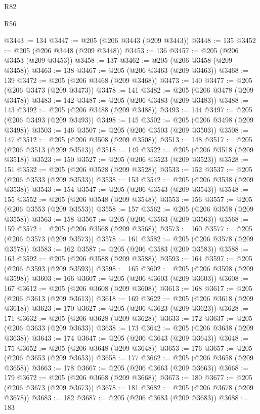 \begin{lexlean}{R82}
\begin{lexlean}{R56}
\begin{coremodule}
{{{{{{{{{{{{{{{{{{{{{{{{{{{{{{{{{{{{{{{{{{{{{{{{{{{{{{{{{{{{{{{{{{{{{{{{{{{{{{{{{{{{{{{{{{{{{{{{{{{{{{{{{{{{{{{{{{{{{{{{{{{{{{{{{{{{{{{{{{{{{{{{{{{{{{{{{{{{{{{{{{{{{{{{{{{{{{{{{{{{{{{{{{{{{{{{{{{{{{{{{{{{{{{{{{{@3443 := 134
@3447 := @205 (@206 @3443 (@209 @3443))
@3448 := 135
@3452 := @205 (@206 @3448 (@209 @3448))
@3453 := 136
@3457 := @205 (@206 @3453 (@209 @3453))
@3458 := 137
@3462 := @205 (@206 @3458 (@209 @3458))
@3463 := 138
@3467 := @205 (@206 @3463 (@209 @3463))
@3468 := 139
@3472 := @205 (@206 @3468 (@209 @3468))
@3473 := 140
@3477 := @205 (@206 @3473 (@209 @3473))
@3478 := 141
@3482 := @205 (@206 @3478 (@209 @3478))
@3483 := 142
@3487 := @205 (@206 @3483 (@209 @3483))
@3488 := 143
@3492 := @205 (@206 @3488 (@209 @3488))
@3493 := 144
@3497 := @205 (@206 @3493 (@209 @3493))
@3498 := 145
@3502 := @205 (@206 @3498 (@209 @3498))
@3503 := 146
@3507 := @205 (@206 @3503 (@209 @3503))
@3508 := 147
@3512 := @205 (@206 @3508 (@209 @3508))
@3513 := 148
@3517 := @205 (@206 @3513 (@209 @3513))
@3518 := 149
@3522 := @205 (@206 @3518 (@209 @3518))
@3523 := 150
@3527 := @205 (@206 @3523 (@209 @3523))
@3528 := 151
@3532 := @205 (@206 @3528 (@209 @3528))
@3533 := 152
@3537 := @205 (@206 @3533 (@209 @3533))
@3538 := 153
@3542 := @205 (@206 @3538 (@209 @3538))
@3543 := 154
@3547 := @205 (@206 @3543 (@209 @3543))
@3548 := 155
@3552 := @205 (@206 @3548 (@209 @3548))
@3553 := 156
@3557 := @205 (@206 @3553 (@209 @3553))
@3558 := 157
@3562 := @205 (@206 @3558 (@209 @3558))
@3563 := 158
@3567 := @205 (@206 @3563 (@209 @3563))
@3568 := 159
@3572 := @205 (@206 @3568 (@209 @3568))
@3573 := 160
@3577 := @205 (@206 @3573 (@209 @3573))
@3578 := 161
@3582 := @205 (@206 @3578 (@209 @3578))
@3583 := 162
@3587 := @205 (@206 @3583 (@209 @3583))
@3588 := 163
@3592 := @205 (@206 @3588 (@209 @3588))
@3593 := 164
@3597 := @205 (@206 @3593 (@209 @3593))
@3598 := 165
@3602 := @205 (@206 @3598 (@209 @3598))
@3603 := 166
@3607 := @205 (@206 @3603 (@209 @3603))
@3608 := 167
@3612 := @205 (@206 @3608 (@209 @3608))
@3613 := 168
@3617 := @205 (@206 @3613 (@209 @3613))
@3618 := 169
@3622 := @205 (@206 @3618 (@209 @3618))
@3623 := 170
@3627 := @205 (@206 @3623 (@209 @3623))
@3628 := 171
@3632 := @205 (@206 @3628 (@209 @3628))
@3633 := 172
@3637 := @205 (@206 @3633 (@209 @3633))
@3638 := 173
@3642 := @205 (@206 @3638 (@209 @3638))
@3643 := 174
@3647 := @205 (@206 @3643 (@209 @3643))
@3648 := 175
@3652 := @205 (@206 @3648 (@209 @3648))
@3653 := 176
@3657 := @205 (@206 @3653 (@209 @3653))
@3658 := 177
@3662 := @205 (@206 @3658 (@209 @3658))
@3663 := 178
@3667 := @205 (@206 @3663 (@209 @3663))
@3668 := 179
@3672 := @205 (@206 @3668 (@209 @3668))
@3673 := 180
@3677 := @205 (@206 @3673 (@209 @3673))
@3678 := 181
@3682 := @205 (@206 @3678 (@209 @3678))
@3683 := 182
@3687 := @205 (@206 @3683 (@209 @3683))
@3688 := 183
}}}}}}}}}}}}}}}}}}}}}}}}}}}}}}}}}}}}}}}}}}}}}}}}}}}}}}}}}}}}}}}}}}}}}}}}}}}}}}}}}}}}}}}}}}}}}}}}}}}}}}}}}}}}}}}}}}}}}}}}}}}}}}}}}}}}}}}}}}}}}}}}}}}}}}}}}}}}}}}}}}}}}}}}}}}}}}}}}}}}}}}}}}}}}}}}}}}}}}}}}}}}}}}}}}}
\end{coremodule}
\end{lexlean}
\end{lexlean}

